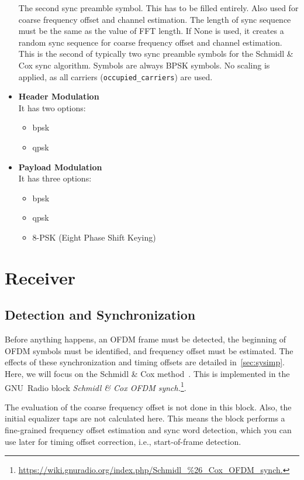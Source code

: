 \begin{itemize}
    The second sync preamble symbol. This has to be filled entirely. Also used for coarse frequency offset and channel estimation. The length of sync sequence must be the same as the value of FFT length.  
    If None is used, it creates a random sync sequence for coarse frequency offset and channel estimation. This is the second of typically two sync preamble symbols for the Schmidl \& Cox sync algorithm. Symbols are always BPSK symbols. No scaling is applied, as all carriers (\texttt{occupied_carriers}) are used.
    \item \textbf{Header Modulation}\\
     It has two options:
    \begin{itemize}
        \item \acrfull{bpsk}
        \item  \acrfull{qpsk}
    \end{itemize}
    \item \textbf{Payload Modulation}\\
    It has three options:
    \begin{itemize}
        \item \acrfull{bpsk}
        \item  \acrfull{qpsk}
        \item  8-PSK (Eight Phase Shift Keying)
    \end{itemize}
\end{itemize}




\section{Receiver}

\subsection{Detection and Synchronization}
Before anything happens, an OFDM frame must be detected, the beginning of OFDM symbols must be identified, and frequency offset must be estimated. The effects of these synchronization and timing offsets are detailed in~\cref{sec:sysimp}. Here, we will focus on the Schmidl \& Cox method~\cite{650240}. This is implemented in the GNU~Radio block \textit{Schmidl \& Cox OFDM synch.}\footnote{\url{https://wiki.gnuradio.org/index.php/Schmidl_\%26_Cox_OFDM_synch.}}.

The evaluation of the coarse frequency offset is not done in this block. Also, the initial equalizer taps are not calculated here. This means the block performs a fine-grained frequency offset estimation and sync word detection, which you can use later for timing offset correction, i.e., start-of-frame detection.

